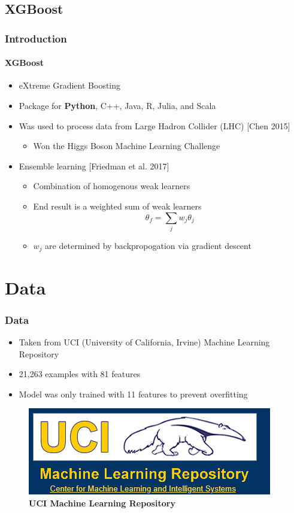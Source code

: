 \documentclass[12pt]{beamer}
\begin{document}
\subsection{XGBoost}
\begin{frame}
\frametitle[allowframebreaks]{Introduction}
\framesubtitle{XGBoost}
\begin{itemize}
  \item<1-> eXtreme Gradient Boosting
  \item<2-> Package for \textbf{Python}, C++, Java, R, Julia, and Scala
  \item<3-> Was used to process data from Large Hadron Collider (LHC) [Chen 2015]
  \begin{itemize}
    \item<4-> Won the Higgs Boson Machine Learning Challenge
  \end{itemize}
  \item<5-> Ensemble learning [Friedman et al. 2017]
  \begin{itemize}
    \item<6-> Combination of homogenous weak learners
    \item<7-> End result is a weighted sum of weak learners
    \[\theta_f = \sum \limits_{j} w_j \theta_j\]
    \item<8-> \(w_j\) are determined by backpropogation via gradient descent
  \end{itemize}
\end{itemize}
\end{frame}


\section{Data}
\begin{frame}
\frametitle{Data}

\begin{itemize}
  \item Taken from UCI (University of California, Irvine) Machine Learning Repository
  \pause
  \item 21,263 examples with 81 features
  \pause
  \item Model was only trained with 11 features to prevent overfitting
  \pause
\end{itemize}

\begin{figure}[h]
  \includegraphics[scale = 0.5]{UCIRepo.png}
  \caption{\textbf{UCI Machine Learning Repository}}
\end{figure}

\end{frame}
\end{document}
